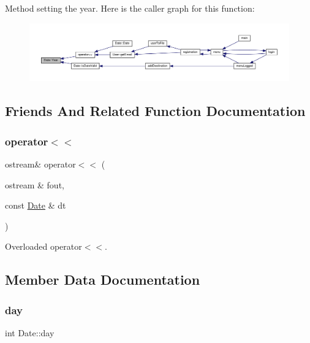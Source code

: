 Method setting the year. Here is the caller graph for this function\+:\nopagebreak
\begin{figure}[H]
\begin{center}
\leavevmode
\includegraphics[width=350pt]{class_date_a284f8985596b83ad9388b464eb6b54bd_icgraph}
\end{center}
\end{figure}


\subsection{Friends And Related Function Documentation}
\mbox{\label{class_date_affced1a8a8f9f0e9dd009af0a22dfe33}} 
\subsubsection{\texorpdfstring{operator$<$$<$}{operator<<}}
{\footnotesize\ttfamily ostream\& operator$<$$<$ (\begin{DoxyParamCaption}\item[{ostream \&}]{fout,  }\item[{const \hyperlink{class_date}{Date} \&}]{dt }\end{DoxyParamCaption})\hspace{0.3cm}{\ttfamily [friend]}}

Overloaded operator$<$$<$. 

\subsection{Member Data Documentation}
\mbox{\label{class_date_a5b192adcabf2b2871e3f0b76c1ec1601}} 
\subsubsection{\texorpdfstring{day}{day}}
{\footnotesize\ttfamily int Date\+::day\hspace{0.3cm}{\ttfamily [private]}}


